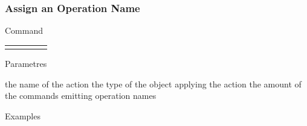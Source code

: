 \documentclass[10pt]{beamer}
\begin{document}
\begin{frame}[t] \frametitle{Assign an Operation Name}

	\begin{block}{Command} 
		\begin{tabularx}{\textwidth}{@{}l@{}l@{}l@{}l@{}R}
			 &
				 &
				 &
				 & \InstrItem
		\end{tabularx}
	\end{block}

	\begin{block}{Parametres} \begin{itemize}
		 the name of the action
		 the type of the object applying the action
		 the amount of the commands emitting operation names
	\end{itemize} \end{block}

	\begin{block}{Examples}
	\end{block}

\end{frame}


\section{}

\begin{frame}
	\begin{center}
	\end{center}
\end{frame}
\end{document}
